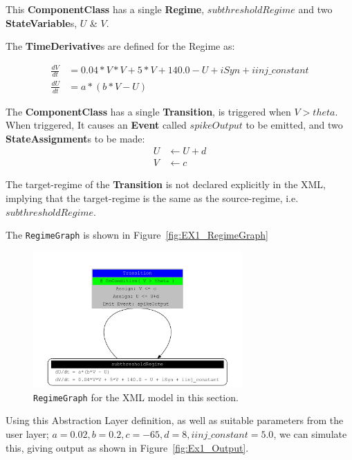 \documentclass{article}
\newcommand{\ComponentClass}{{\bf{ComponentClass}}\xspace}
\newcommand{\StateVariables}{{\bf{StateVariable}}s\xspace}
\newcommand{\StateAssignments}{{\bf{StateAssignment}}s\xspace}
\newcommand{\TimeDerivatives}{{\bf{TimeDerivative}}s\xspace}
\newcommand{\Event}{{\bf{Event}}\xspace}
\newcommand{\Regime}{{\bf{Regime}}\xspace}
\newcommand{\Transition}{{\bf{Transition}}\xspace}
\begin{document}
\noindent
%
This \ComponentClass has a single \Regime, $subthresholdRegime$ and two
\StateVariables, $U$ \& $V$.

\noindent
The \TimeDerivatives are defined for the Regime as:

\begin{align}
\frac{dV}{dt} &= 0.04*V*V + 5*V + 140.0 - U + iSyn + iinj\_constant   \\
\frac{dU}{dt} &= a * ( b* V -U )
\end{align}

\noindent
The \ComponentClass has a single \Transition, is triggered when $V>theta$. When
triggered, It causes an \Event called $spikeOutput$ to be emitted, and two
\StateAssignments to be made:
\begin{align}
U &\leftarrow U + d \\
V &\leftarrow c
\end{align}

The target-regime of the \Transition is not declared explicitly in the XML,
implying that the
target-regime is the same as the source-regime, i.e. $subthresholdRegime$.

The {\tt RegimeGraph} is shown in Figure~\ref{fig:EX1_RegimeGraph}

\begin{figure}[htb!]
\center
\includegraphics[width=8cm]{figures/example_IzRegimeTransGraph.pdf}
\protect\caption{{\tt RegimeGraph} for the XML model in this section.}
\label{fig:EX3_RegimeGraph}
\end{figure}


Using this Abstraction Layer definition, as well as suitable parameters from the
user layer; $a=0.02, b=0.2, c=-65, d= 8, iinj\_constant= 5.0$, we can simulate
this, giving output as shown in Figure~\ref{fig:Ex1_Output}.
\end{document}
